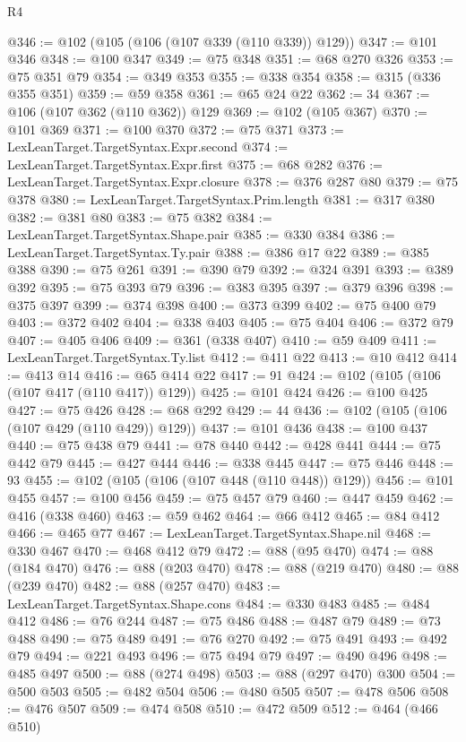 \begin{lexlean}{R4}
\begin{coremodule}
{{{{{{{{{{{{{{{{{{{{{{{{{{{{{{{{{{{{{{{{{{{{{{{{{{{{{{{{{{{{{{{{{{{{{{{{{{{{{{{{{{{{{{{{{{{{@346 := @102 (@105 (@106 (@107 @339 (@110 @339)) @129))
@347 := @101 @346
@348 := @100 @347
@349 := @75 @348
@351 := @68 @270 @326
@353 := @75 @351 @79
@354 := @349 @353
@355 := @338 @354
@358 := @315 (@336 @355 @351)
@359 := @59 @358
@361 := @65 @24 @22
@362 := 34
@367 := @106 (@107 @362 (@110 @362)) @129
@369 := @102 (@105 @367)
@370 := @101 @369
@371 := @100 @370
@372 := @75 @371
@373 := LexLeanTarget.TargetSyntax.Expr.second
@374 := LexLeanTarget.TargetSyntax.Expr.first
@375 := @68 @282
@376 := LexLeanTarget.TargetSyntax.Expr.closure
@378 := @376 @287 @80
@379 := @75 @378
@380 := LexLeanTarget.TargetSyntax.Prim.length
@381 := @317 @380
@382 := @381 @80
@383 := @75 @382
@384 := LexLeanTarget.TargetSyntax.Shape.pair
@385 := @330 @384
@386 := LexLeanTarget.TargetSyntax.Ty.pair
@388 := @386 @17 @22
@389 := @385 @388
@390 := @75 @261
@391 := @390 @79
@392 := @324 @391
@393 := @389 @392
@395 := @75 @393 @79
@396 := @383 @395
@397 := @379 @396
@398 := @375 @397
@399 := @374 @398
@400 := @373 @399
@402 := @75 @400 @79
@403 := @372 @402
@404 := @338 @403
@405 := @75 @404
@406 := @372 @79
@407 := @405 @406
@409 := @361 (@338 @407)
@410 := @59 @409
@411 := LexLeanTarget.TargetSyntax.Ty.list
@412 := @411 @22
@413 := @10 @412
@414 := @413 @14
@416 := @65 @414 @22
@417 := 91
@424 := @102 (@105 (@106 (@107 @417 (@110 @417)) @129))
@425 := @101 @424
@426 := @100 @425
@427 := @75 @426
@428 := @68 @292
@429 := 44
@436 := @102 (@105 (@106 (@107 @429 (@110 @429)) @129))
@437 := @101 @436
@438 := @100 @437
@440 := @75 @438 @79
@441 := @78 @440
@442 := @428 @441
@444 := @75 @442 @79
@445 := @427 @444
@446 := @338 @445
@447 := @75 @446
@448 := 93
@455 := @102 (@105 (@106 (@107 @448 (@110 @448)) @129))
@456 := @101 @455
@457 := @100 @456
@459 := @75 @457 @79
@460 := @447 @459
@462 := @416 (@338 @460)
@463 := @59 @462
@464 := @66 @412
@465 := @84 @412
@466 := @465 @77
@467 := LexLeanTarget.TargetSyntax.Shape.nil
@468 := @330 @467
@470 := @468 @412 @79
@472 := @88 (@95 @470)
@474 := @88 (@184 @470)
@476 := @88 (@203 @470)
@478 := @88 (@219 @470)
@480 := @88 (@239 @470)
@482 := @88 (@257 @470)
@483 := LexLeanTarget.TargetSyntax.Shape.cons
@484 := @330 @483
@485 := @484 @412
@486 := @76 @244
@487 := @75 @486
@488 := @487 @79
@489 := @73 @488
@490 := @75 @489
@491 := @76 @270
@492 := @75 @491
@493 := @492 @79
@494 := @221 @493
@496 := @75 @494 @79
@497 := @490 @496
@498 := @485 @497
@500 := @88 (@274 @498)
@503 := @88 (@297 @470) @300
@504 := @500 @503
@505 := @482 @504
@506 := @480 @505
@507 := @478 @506
@508 := @476 @507
@509 := @474 @508
@510 := @472 @509
@512 := @464 (@466 @510)
}}}}}}}}}}}}}}}}}}}}}}}}}}}}}}}}}}}}}}}}}}}}}}}}}}}}}}}}}}}}}}}}}}}}}}}}}}}}}}}}}}}}}}}}}}}}
\end{coremodule}
\end{lexlean}
